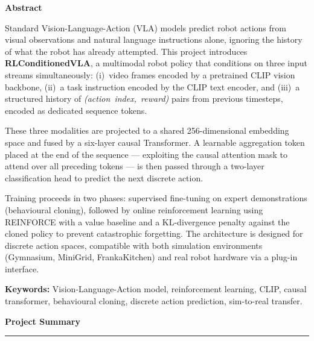 \documentclass[12pt, a4paper]{article}
\begin{document}
\newpage
\thispagestyle{fancy}
{}
\begin{center}
  {\large\bfseries Abstract}
\end{center}

\noindent
Standard Vision-Language-Action (VLA) models predict robot actions from
visual observations and natural language instructions alone, ignoring the
history of what the robot has already attempted.
This project introduces \textbf{RLConditionedVLA}, a multimodal robot
policy that conditions on three input streams simultaneously: (i)~video
frames encoded by a pretrained CLIP vision backbone, (ii)~a task instruction
encoded by the CLIP text encoder, and (iii)~a structured history of
\emph{(action~index,~reward)} pairs from previous timesteps, encoded as
dedicated sequence tokens.

These three modalities are projected to a shared 256-dimensional embedding
space and fused by a six-layer causal Transformer.
A learnable aggregation token placed at the end of the sequence — exploiting
the causal attention mask to attend over all preceding tokens — is then passed
through a two-layer classification head to predict the next discrete action.

Training proceeds in two phases: supervised fine-tuning on expert
demonstrations (behavioural cloning), followed by online reinforcement
learning using REINFORCE with a value baseline and a KL-divergence penalty
against the cloned policy to prevent catastrophic forgetting.
The architecture is designed for discrete action spaces, compatible with both
simulation environments (Gymnasium, MiniGrid, FrankaKitchen) and real robot
hardware via a plug-in interface.

\vspace{8pt}
\noindent\textbf{Keywords:} Vision-Language-Action model, reinforcement learning,
CLIP, causal transformer, behavioural cloning, discrete action prediction,
sim-to-real transfer.

\newpage
\tableofcontents


\newpage

{}
\begin{center}
  {\Large\bfseries\color{TitleBlue} Project Summary}
  \vspace{4pt}\\
  \color{NavyBlue}\rule{0.6\linewidth}{1.2pt}
\end{center}
\end{document}
